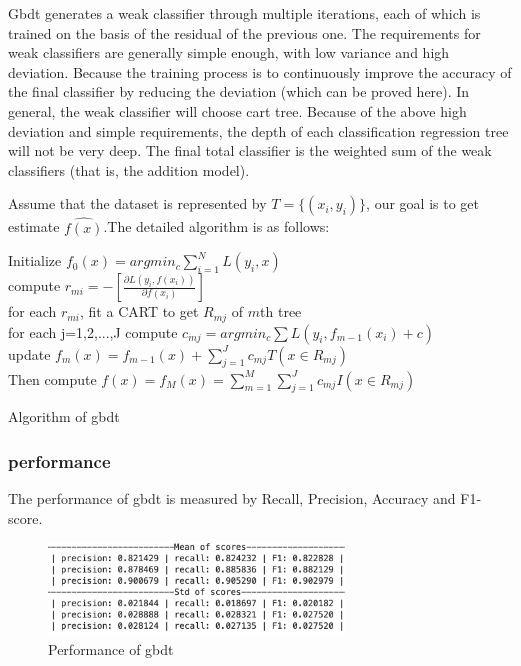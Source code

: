 \documentclass[11pt,en]{elegantpaper}
\begin{document}
Gbdt generates a weak classifier through multiple iterations, each of which is trained on the basis of the residual of the previous one. The requirements for weak classifiers are generally simple enough, with low variance and high deviation. Because the training process is to continuously improve the accuracy of the final classifier by reducing the deviation (which can be proved here).
In general, the weak classifier will choose cart tree. Because of the above high deviation and simple requirements, the depth of each classification regression tree will not be very deep. The final total classifier is the weighted sum of the weak classifiers (that is, the addition model).


Assume that the dataset is represented by $T=\{(x_i, y_i)\}$, our goal is to get estimate $\hat{f(x)}$.The detailed algorithm is as follows:

\begin{algorithm}[H]
\SetAlgoLined
{}
Initialize $f_0(x) = argmin_c \sum_{i=1}^N L(y_i, x)$\\
{
  	{
	compute $r_{mi} = -[\frac{\partial L(y_i, f(x_i))}{\partial f(x_i)}]$\\
	for each $r_{mi}$, fit a CART to get $R_{mj}$ of $m$th tree\\
	for each j=1,2,...,J compute $c_{mj} = argmin_c \sum L(y_i, f_{m-1}(x_i)+c)$\\
	update $f_m(x) = f_{m-1}(x) + \sum_{j=1}^J c_{mj}T(x \in R_{mj})$\\
	}
  Then compute $\hat{f(x)} = f_M(x) = \sum_{m=1}^M \sum_{j=1}^J c_{mj}I (x \in R_{mj})$
}
\caption{Algorithm of gbdt}
\end{algorithm}

\subsubsection{performance}
The performance of gbdt is measured by Recall, Precision, Accuracy and F1-score.

\begin{figure}[H]
	\centering
	\includegraphics[width=0.7\textwidth]{image/gbdt_perf.png}
	\caption{Performance of gbdt}
	\label{gbdt1_performance}
\end{figure}


\end{document}
